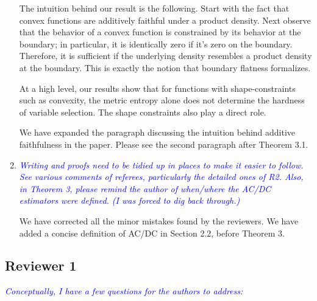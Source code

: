\documentclass[pdftex,12pt]{article}
\def\rc#1{{\it\textcolor{blue}{#1}}\smallskip}
\begin{document}
\begin{enumerate}
The intuition behind our result is the following. Start with the fact
that convex functions are additively faithful under a product
density. Next observe that the behavior of a convex function is constrained
by its behavior at the boundary; in particular, it is identically zero
if it's zero on the boundary. Therefore, it is sufficient if the 
underlying density resembles a product density at the boundary.  This is
exactly the notion that boundary flatness formalizes.

At a high level, our results show that for functions with
shape-constraints such as convexity, the metric entropy alone does not
determine the hardness of variable selection.  The shape constraints
also play a direct role.

We have expanded the paragraph discussing the intuition behind
additive faithfulness in the paper. Please see the second paragraph
after Theorem 3.1.

\item \rc{Writing and proofs need to be tidied up in places to make it easier
to follow.  See various comments of referees, particularly the
detailed ones of R2.  Also, in Theorem 3, please remind the author of
when/where the AC/DC estimators were defined.  (I was forced to dig
back through.)}


We have corrected all the minor mistakes found by the reviewers.
We have added a concise definition of AC/DC in Section 2.2, before Theorem 3. 


\end{enumerate}

\subsection*{Reviewer 1}

\rc{Conceptually, I have a few questions for the authors to address:}
\end{document}
